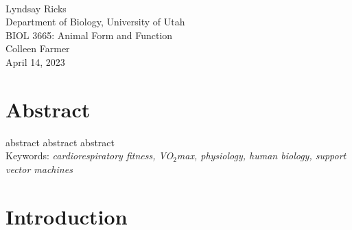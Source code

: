 \documentclass{article}
\begin{document}
\begin{titlepage}
	\centering
	\vspace*{0.2\textheight}
	\textbf{}\\
	Lyndsay Ricks\\
	Department of Biology, University of Utah\\
	BIOL 3665: Animal Form and Function\\
	Colleen Farmer\\
	April 14, 2023
\end{titlepage}
\section{Abstract}

{\parindent0pt abstract abstract abstract} \\

{\parindent0pt Keywords: \emph{cardiorespiratory fitness, VO$_2$max, physiology, human biology, support vector machines}}

\pagebreak

\section{Introduction}
\end{document}

